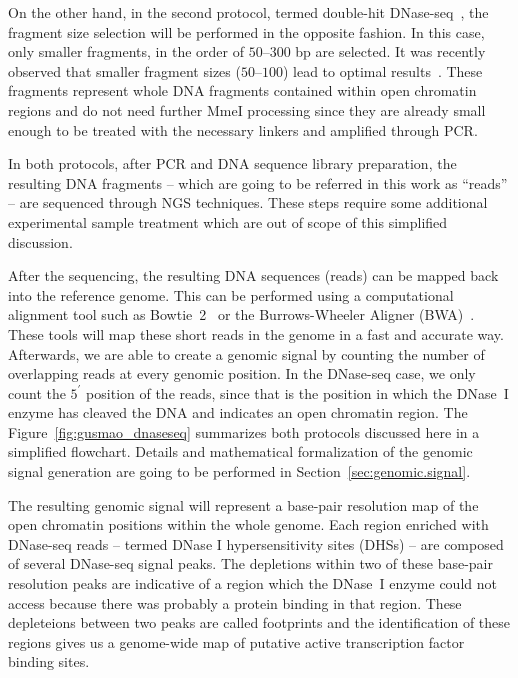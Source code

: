 On the other hand, in the second protocol, termed double-hit DNase-seq~\cite{sabo2004a}, the fragment size selection will be performed in the opposite fashion. In this case, only smaller fragments, in the order of $50$--$300$ bp are selected. It was recently observed that smaller fragment sizes ($50$--$100$) lead to optimal results~\cite{he2014}. These fragments represent whole DNA fragments contained within open chromatin regions and do not need further MmeI processing since they are already small enough to be treated with the necessary linkers and amplified through PCR.

In both protocols, after PCR and DNA sequence library preparation, the resulting DNA fragments -- which are going to be referred in this work as ``reads'' -- are sequenced through NGS techniques. These steps require some additional experimental sample treatment which are out of scope of this simplified discussion.

After the sequencing, the resulting DNA sequences (reads) can be mapped back into the reference genome. This can be performed using a computational alignment tool such as Bowtie~2~\cite{langmead2012} or the Burrows-Wheeler Aligner (BWA)~\cite{li2009b}. These tools will map these short reads in the genome in a fast and accurate way. Afterwards, we are able to create a genomic signal by counting the number of overlapping reads at every genomic position. In the DNase-seq case, we only count the $5^{\prime}$ position of the reads, since that is the position in which the DNase~I enzyme has cleaved the DNA and indicates an open chromatin region. The Figure~\ref{fig:gusmao_dnaseseq} summarizes both protocols discussed here in a simplified flowchart. Details and mathematical formalization of the genomic signal generation are going to be performed in Section~\ref{sec:genomic.signal}.

The resulting genomic signal will represent a base-pair resolution map of the open chromatin positions within the whole genome. Each region enriched with DNase-seq reads -- termed DNase I hypersensitivity sites (DHSs) -- are composed of several DNase-seq signal peaks. The depletions within two of these base-pair resolution peaks are indicative of a region which the DNase~I enzyme could not access because there was probably a protein binding in that region. These depleteions between two peaks are called footprints and the identification of these regions gives us a genome-wide map of putative active transcription factor binding sites.

